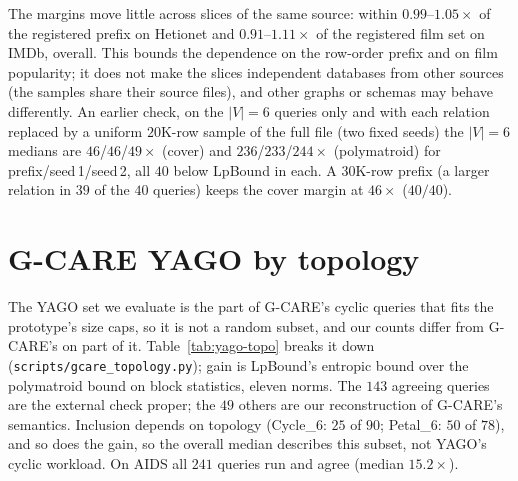 \documentclass[11pt]{article}
\begin{document}
The margins move little across slices of the same source: within
$0.99$--$1.05\times$ of the registered prefix on Hetionet and
$0.91$--$1.11\times$ of the registered film set on IMDb, overall. This
bounds the dependence on the row-order prefix and on film popularity; it
does not make the slices independent databases from other sources (the
samples share their source files), and other graphs or schemas may behave
differently. An earlier check, on the $|V|{=}6$ queries only and with each relation
replaced by a uniform $20$K-row sample of the full file (two fixed seeds)
the $|V|{=}6$ medians are $46$/$46$/$49\times$ (cover) and
$236$/$233$/$244\times$ (polymatroid) for prefix/seed\,1/seed\,2, all $40$ below LpBound in each. A $30$K-row prefix (a larger relation in $39$ of the $40$ queries) keeps the cover margin at $46\times$ ($40/40$).

\section{G-CARE YAGO by topology}
The YAGO set we evaluate is the part of G-CARE's cyclic queries that fits
the prototype's size caps, so it is not a random subset, and our counts
differ from G-CARE's on part of it. Table~\ref{tab:yago-topo} breaks it
down (\texttt{scripts/gcare\_topology.py}); gain is LpBound's entropic
bound over the polymatroid bound on block statistics, eleven norms. The
$143$ agreeing queries are the external check proper; the $49$ others are
our reconstruction of G-CARE's semantics. Inclusion depends on topology
(Cycle\_6: $25$ of $90$; Petal\_6: $50$ of $78$), and so does the gain, so
the overall median describes this subset, not YAGO's cyclic workload. On
AIDS all $241$ queries run and agree (median $15.2\times$).
\end{document}
